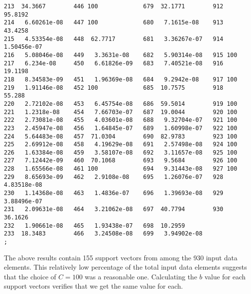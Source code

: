\documentclass{article}
\begin{document}
\begin{verbatim}
213  34.3667        446 100             679  32.1771        912  95.8192
214   6.60261e-08   447 100             680   7.1615e-08    913  43.4258
215   4.53354e-08   448  62.7717        681   3.36267e-07   914   1.50456e-07
216   5.08046e-08   449   3.3631e-08    682   5.90314e-08   915 100
217   6.234e-08     450   6.61826e-09   683   7.40521e-08   916  19.1198
218   8.34583e-09   451   1.96369e-08   684   9.2942e-08    917 100
219   1.91146e-08   452 100             685  10.7575        918  55.288
220   2.72102e-08   453   6.45754e-08   686  59.5014        919 100
221   1.2318e-08    454   7.66703e-07   687  19.0044        920 100
222   2.73081e-08   455   4.03601e-08   688   9.32704e-07   921 100
223   2.45947e-08   456   1.64845e-07   689   1.60998e-07   922 100
224   5.64483e-08   457  71.0304        690  82.9783        923 100
225   2.69912e-08   458   4.19629e-08   691   2.57498e-08   924 100
226   1.63384e-08   459   3.58107e-08   692   3.11657e-08   925 100
227   7.12442e-09   460  70.1068        693   9.5684        926 100
228   1.65566e-08   461 100             694   9.31443e-08   927 100
229   8.65693e-09   462   2.9108e-08    695   1.26076e-07   928   4.83518e-08
230   1.14368e-08   463   1.4836e-07    696   1.39693e-08   929   3.88496e-07
231   2.09631e-08   464   3.21062e-08   697  40.7794        930  36.1626
232   1.90661e-08   465   1.93438e-07   698  10.2959
233  18.3483        466   3.24508e-08   699   3.94902e-08
;

\end{verbatim}

The above results contain 155 support vectors from among the 930 input data elements. This relatively low percentage of the total input data elements suggests that the choice of \(C=100\) was a reasonable one. Calculating the \(b\) value for each support vectors verifies that we get the same value for each.
\end{document}
